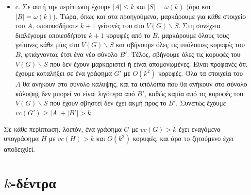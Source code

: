 \documentclass[a4paper, oneside, 11pt]{article}
\theoremstyle{definition}
\begin{document}
\begin{enumerate}
\begin{itemize}
\item{c.}
Σε αυτή την περίπτωση έχουμε $|A|\leq k$ και $|S|=\omega(k)$ (άρα και $|B|=\omega(k)$). Τώρα, όπως και στα προηγούμενα, μαρκάρουμε για κάθε στοιχείο του $A$, οποιουσδήποτε $k+1$ γείτονές του στο
$V(G)\backslash S$. Στη συνέχεια διαλέγουμε οποιεσδήποτε $k+1$ κορυφές από το $B$, μαρκάρουμε όλους τους γείτονες κάθε μίας στο $V(G)\backslash S$ και σβήνουμε όλες τις υπόλοιπες κορυφές του $B$,
φτιάχνοντας έτσι ένα νέο σύνολο $B'$.
Τέλος, σβήνουμε όλες τις κορυφές του $V(G)\backslash S$ που δεν έχουν μαρκαριστεί ή είναι απομονωμένες. Είναι προφανές ότι έχουμε καταλήξει σε ένα γράφημα $G'$
με $O(k^2)$ κορυφές. Όλα τα στοιχεία του $A$ θα ανήκουν
στο σύνολο κάλυψης, και τα υπόλοιπα που θα ανήκουν στο σύνολο κάλυψης δεν μπορεί να είναι λιγότερα από $B'$, καθώς καμία από τις κορυφές του $V(G)\backslash S$ που έχουν σβηστεί δεν έχει ακμή
προς το $B'$. Συνεπώς έχουμε $vc(G')\geq |A| + |B'| > k$.

\end{itemize}
Σε κάθε περίπτωση, λοιπόν, ένα γράφημα $G$ με $vc(G)>k$ έχει εναγόμενο υπογράφημα $H$ με $vc(H)>k$ και $O(k^2)$ κορυφές, και άρα το ζητούμενο έχει αποδειχθεί.
\end{enumerate}
\section{$k$-δέντρα}
\end{document}
